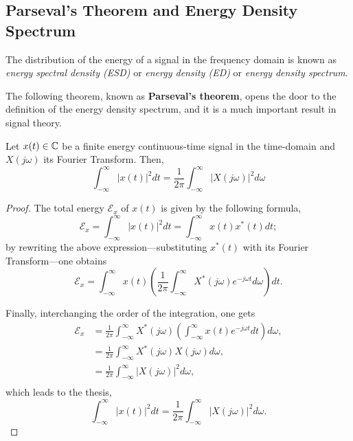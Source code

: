 \documentclass[\documentfontsize, twocolumn]{\classname}
\begin{document}
\subsection{Parseval's Theorem and Energy Density Spectrum}

The distribution of the energy of a signal in the frequency domain is known as \emph{energy spectral density (ESD)} or \emph{energy density (ED)} or \emph{energy density spectrum}.

The following theorem, known as \textbf{Parseval's theorem}, opens the door to the definition of the energy density spectrum, and it is a much important result in signal theory.

\begin{thm}
    Let $x(t) \in \mathbb C$ be a finite energy continuous-time signal in the time-domain and $X(j\omega)$ its Fourier Transform. Then,
    \begin{equation}\label{eqn:parsevalTheorem}
        \int_{-\infty}^\infty|x(t)|^2dt = \frac 1 {2\pi} \int_{-\infty}^\infty\left|X(j\omega)\right|^2 d\omega
    \end{equation}
\end{thm}

\begin{proof}
The total energy $\mathcal E_x$ of $x(t)$ is given by the following formula,
\[
    \mathcal E_x = \int_{-\infty}^\infty |x(t)|^2dt = \int_{-\infty}^\infty x(t)x^*(t)dt;
\]
by rewriting the above expression---substituting $x^*(t)$ with its Fourier Transform---one obtains
\[
    \mathcal E_x = \int_{-\infty}^\infty x(t)\left(\frac{1}{2\pi}\int_{-\infty}^\infty X^* (j\omega) e^{-j\omega t} d\omega \right) dt.
\]

Finally, interchanging the order of the integration, one gets
\begin{align*}
    \mathcal E_x &= \frac{1}{2\pi}\int_{-\infty}^\infty X^*(j\omega)\left(\int_{-\infty}^\infty x (t) e^{-j\omega t} dt \right) d\omega,\\
                 &= \frac{1}{2\pi}\int_{-\infty}^\infty X^*(j\omega)X(j\omega) d\omega,\\
                 &= \frac{1}{2\pi}\int_{-\infty}^\infty \left|X(j\omega)\right|^2 d\omega,\\
\end{align*}
which leads to the thesis,
\[
        \int_{-\infty}^\infty|x(t)|^2dt = \frac 1 {2\pi} \int_{-\infty}^\infty\left|X(j\omega)\right|^2 d\omega.
\]
\end{proof}
\end{document}
